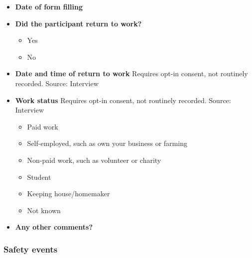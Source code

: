 \documentclass[
]{scrartcl}
\providecommand{\tightlist}{%
  \setlength{\itemsep}{0pt}\setlength{\parskip}{0pt}}\usepackage{longtable,booktabs,array}
\begin{document}
\begin{itemize}
\item
  \textbf{Date of form filling}
\item
  \textbf{Did the participant return to work?}

  \begin{itemize}
  \tightlist
  \item
    Yes
  \item
    No
  \end{itemize}
\item
  \textbf{Date and time of return to work} Requires opt-in consent, not
  routinely recorded. Source: Interview
\item
  \textbf{Work status} Requires opt-in consent, not routinely recorded.
  Source: Interview

  \begin{itemize}
  \tightlist
  \item
    Paid work
  \item
    Self-employed, such as own your business or farming
  \item
    Non-paid work, such as volunteer or charity
  \item
    Student
  \item
    Keeping house/homemaker
  \item
    Not known
  \end{itemize}
\item
  \textbf{Any other comments?}
\end{itemize}

\subsubsection{Safety events}\label{safety-events}
\end{document}
